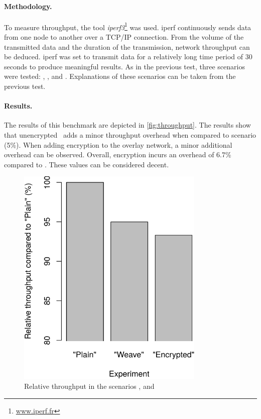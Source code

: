 \paragraph{Methodology.} To measure throughput, the tool \emph{iperf3}\footnote{\url{www.iperf.fr}} was used. iperf continuously sends data from one node to another over a TCP/IP connection. From the volume of the transmitted data and the duration of the transmission, network throughput can be deduced. iperf was set to transmit data for a relatively long time period of 30 seconds to produce meaningful results. As in the previous test, three scenarios were tested:  , , and . Explanations of these scenarios can be taken from the previous test.

\paragraph{Results.} The results of this benchmark are depicted in \autoref{fig:throughput}. The results show that unencrypted \wnet\ adds a minor throughput overhead when compared to  scenario (5\%). When adding encryption to the overlay network, a minor additional overhead can be observed. Overall, encryption incurs an overhead of 6.7\% compared to . These values can be considered decent. 


\begin{figure}[htpb]
  \centering
  \includegraphics[width=0.8\textwidth]{figures/throughput}
  \caption[Weave throughput benchmark results]{Relative throughput in the scenarios ,  and }\label{fig:throughput}
\end{figure}


